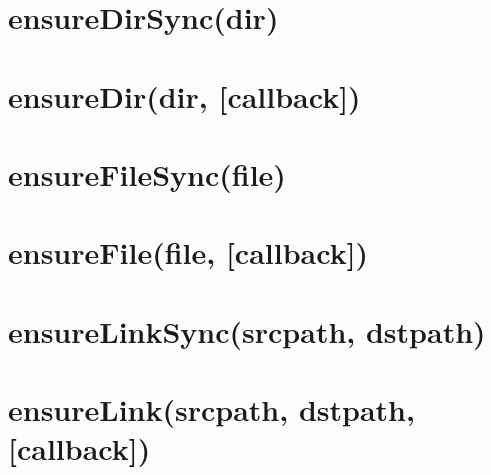 \documentclass[twoside]{book}
\newcommand{\+}{\discretionary{\mbox{\scriptsize$\hookleftarrow$}}{}{}}
\begin{document}
\chapter{ensure\+Dir\+Sync(dir)}
\label{md_dsmacc_vis_degree_node_modules_electron-packager_node_modules_fs-extra_docs_ensureDir-sync}

\chapter{ensure\+Dir(dir, \mbox{[}callback\mbox{]})}
\label{md_dsmacc_vis_degree_node_modules_electron-packager_node_modules_fs-extra_docs_ensureDir}

\chapter{ensure\+File\+Sync(file)}
\label{md_dsmacc_vis_degree_node_modules_electron-packager_node_modules_fs-extra_docs_ensureFile-sync}

\chapter{ensure\+File(file, \mbox{[}callback\mbox{]})}
\label{md_dsmacc_vis_degree_node_modules_electron-packager_node_modules_fs-extra_docs_ensureFile}

\chapter{ensure\+Link\+Sync(srcpath, dstpath)}
\label{md_dsmacc_vis_degree_node_modules_electron-packager_node_modules_fs-extra_docs_ensureLink-sync}

\chapter{ensure\+Link(srcpath, dstpath, \mbox{[}callback\mbox{]})}
\label{md_dsmacc_vis_degree_node_modules_electron-packager_node_modules_fs-extra_docs_ensureLink}

\end{document}

